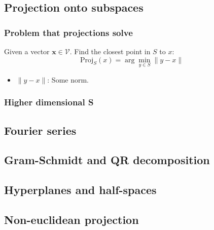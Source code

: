 \subsection{Projection onto subspaces}
    
    \subsubsection{Problem that projections solve}
        \begin{definition}
            Given a vector $\mathbf{x}\in \mathcal{V}$. Find the closest point in $S$ to $x$: 
            \begin{equation}
                \text{Proj}_S(x) = \arg\min_{y \in S} \| y - x \|
            \end{equation}
            \begin{itemize}
                \item $\| y - x \|$: Some norm.
            \end{itemize}
        \end{definition}

    \subsubsection{Higher dimensional S} %
    \begin{definition}
    \end{definition}

\subsection{Fourier series}

\subsection{Gram-Schmidt and QR decomposition}
\subsection{Hyperplanes and half-spaces}
\subsection{Non-euclidean projection}
